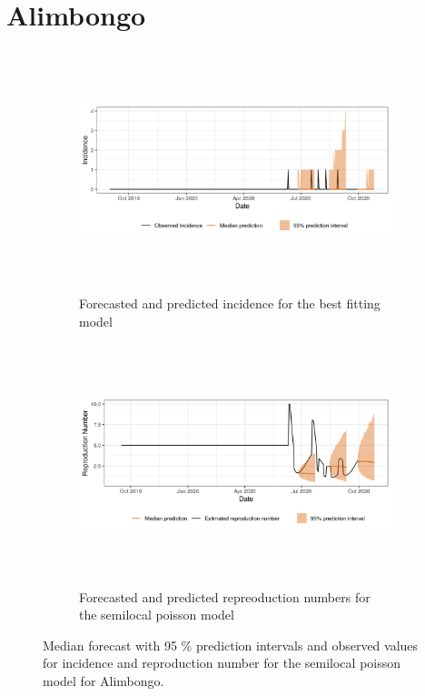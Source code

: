  \section{ Alimbongo }\begin{figure}[H]\begin{subfigure}{\textwidth}  \centering  \includegraphics[width=0.9\linewidth, height=7cm]{../output/Alimbongo_predictions.png}  \caption{Forecasted and predicted incidence for the best fitting model}\end{subfigure}

\begin{subfigure}{\textwidth}  \centering  \includegraphics[width=0.9\linewidth, height=7cm]{../output/Alimbongo_Rs.png}  \caption{Forecasted and predicted repreoduction numbers for the semilocal poisson model}\end{subfigure}  \caption{Median forecast with 95 \% prediction intervals and observed values for incidence and reproduction number for the semilocal poisson model for Alimbongo.}\end{figure}

